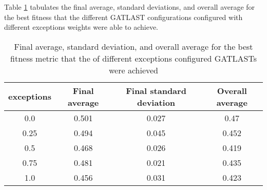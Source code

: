 Table \ref{tab:HP:GA:Exceptions:best fitness} tabulates the final average, standard deviations, and overall average for the best fitness that the different GATLAST configurations configured with different exceptions weights were able to achieve.
\begin{table}[tbh!]
\centering
\begin{adjustbox}{trim=0cm 0cm 0cm 0cm, clip=true}
\begin{tabular}{|c|c|c|c|}
\hline
exceptions & Final average & Final standard deviation & Overall average\\
\hline
0.0 & 0.501 & 0.027 & 0.47\\\hline
0.25 & 0.494 & 0.045 & 0.452\\\hline
0.5 & 0.468 & 0.026 & 0.419\\\hline
0.75 & 0.481 & 0.021 & 0.435\\\hline
1.0 & 0.456 & 0.031 & 0.423\\\hline
\end{tabular}
\end{adjustbox}
\caption{Final average, standard deviation, and overall average for the best fitness metric that the of different exceptions configured GATLASTs were achieved}
\label{tab:HP:GA:Exceptions:best fitness}
\end{table}